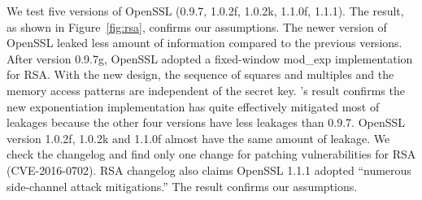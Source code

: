 We test five versions of OpenSSL (0.9.7, 1.0.2f, 1.0.2k, 1.1.0f, 1.1.1). 
The result, as shown in Figure~\ref{fig:rsa}, confirms 
our assumptions. The newer version of
OpenSSL leaked less amount of information compared to the previous versions.
After version 0.9.7g, OpenSSL adopted a fixed-window mod\_exp implementation 
for RSA\@. With the new design, the sequence of squares and multiples and the 
memory access patterns are independent of the secret key. \tool{}'s result
confirms the new exponentiation implementation has quite effectively mitigated 
most of leakages because the other four versions have less leakages than 0.9.7. 
OpenSSL version 1.0.2f, 1.0.2k and 1.1.0f almost have the same amount of leakage. 
We check the changelog and find only one change for patching vulnerabilities
for RSA (CVE-2016-0702). RSA changelog also claims OpenSSL 1.1.1 adopted
``numerous side-channel attack mitigations.'' The result confirms our assumptions.
